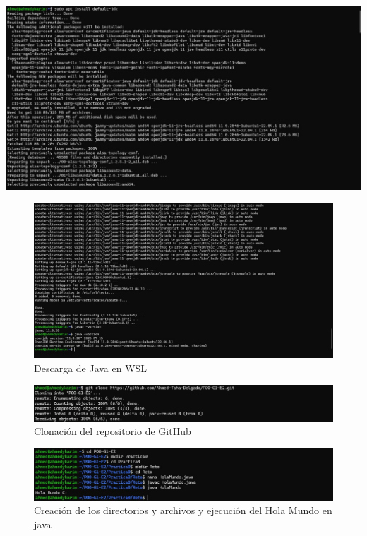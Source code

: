 \documentclass[letterpaper,12pt]{article}
\begin{document}
\begin{center}
    \includegraphics[width=14cm]{Imagenes/descarga1.jpeg}
\end{center}

\begin{figure}[H]
    \centering
    \includegraphics[width=14cm]{Imagenes/descarga2.jpg}
    \caption{Descarga de Java en WSL}
    \label{fig:java}
\end{figure}

\begin{figure}[H]
    \centering
    \includegraphics[width=14cm]{Imagenes/clonar.jpeg}
    \caption{Clonación del repositorio de GitHub}
    \label{fig:java}
\end{figure}

\begin{figure}[H]
    \centering
    \includegraphics[width=14cm]{Imagenes/creacion.jpeg}
    \caption{Creación de los directorios y archivos y ejecución del Hola Mundo en java}
    \label{fig:java}
\end{figure}
\end{document}
